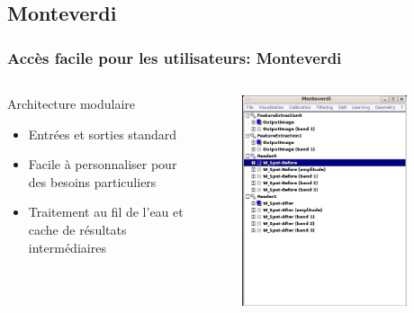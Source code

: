 \documentclass[compress]{beamer}
\begin{document}
\subsection{Monteverdi}
\begin{frame}
\frametitle{Accès facile pour les utilisateurs: Monteverdi}
\begin{columns}
\begin{column}{0.5\textwidth}
\begin{block}{Architecture modulaire}
\scriptsize
\begin{itemize}
\item Entrées et sorties standard
\item Facile à personnaliser pour des besoins particuliers
\item Traitement au fil de l'eau et cache de résultats intermédiaires
\end{itemize}
\end{block}
\end{column}
\begin{column}{0.5\textwidth}
\begin{figure}[]
  \includegraphics[width=0.9\textwidth]{monteverdi1.jpg}
\end{figure}
\end{column}
\end{columns}
\end{frame}
\end{document}

